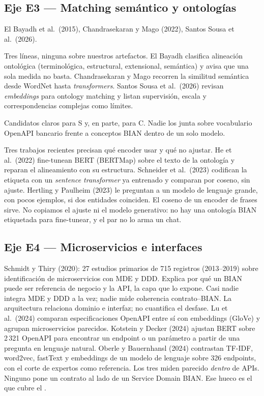 \subsection{Eje E3 --- Matching semántico y ontologías}

El Bayadh et al.\ (2015), Chandrasekaran y Mago (2022), Santos Sousa et al.\ (2026).

Tres líneas, ninguna sobre nuestros artefactos. El Bayadh clasifica alineación ontológica
(terminológica, estructural, extensional, semántica) y avisa que una sola medida no basta.
Chandrasekaran y Mago recorren la similitud semántica desde WordNet hasta \textit{transformers}.
Santos Sousa et al.\ (2026) revisan \textit{embeddings} para ontology matching y listan supervisión,
escala y correspondencias complejas como límites.

Candidatos claros para S y, en parte, para C. Nadie los junta sobre vocabulario OpenAPI bancario
frente a conceptos BIAN dentro de un solo modelo.

Tres trabajos recientes precisan qué encoder usar y qué no ajustar. He et al.\ (2022) fine-tunean
BERT (BERTMap) sobre el texto de la ontología y reparan el alineamiento con su estructura.
Schneider et al.\ (2023) codifican la etiqueta con un \textit{sentence transformer} ya entrenado
y comparan por coseno, sin ajuste. Hertling y Paulheim (2023) le preguntan a un modelo de
lenguaje grande, con pocos ejemplos, si dos entidades coinciden. El coseno de un encoder de
frases sirve. No copiamos el ajuste ni el modelo generativo: no hay una ontología BIAN etiquetada
para fine-tunear, y el par no lo arma un chat.

\subsection{Eje E4 --- Microservicios e interfaces}

Schmidt y Thiry (2020): 27 estudios primarios de 715 registros (2013--2019) sobre identificación de
microservicios con MDE y DDD. Explica por qué un \ServiceDomain{} BIAN puede ser referencia de
negocio y la API, la capa que lo expone. Casi nadie integra MDE y DDD a la vez; nadie mide
coherencia contrato--BIAN. La arquitectura relaciona dominio e interfaz; no cuantifica el desfase.
Lu et al.\ (2024) comparan especificaciones OpenAPI entre sí con embeddings (GloVe) y agrupan
microservicios parecidos. Kotstein y Decker (2024) ajustan BERT sobre 2\,321 OpenAPI para
encontrar un endpoint o un parámetro a partir de una pregunta en lenguaje natural. Oberle y
Bauernhansl (2024) contrastan TF-IDF, word2vec, fastText y embeddings de un modelo de lenguaje
sobre 326 endpoints, con el corte de expertos como referencia. Los tres miden parecido
\textit{dentro} de APIs. Ninguno pone un contrato al lado de un Service Domain BIAN. Ese hueco
es el que cubre el \AlignmentScore{}.

